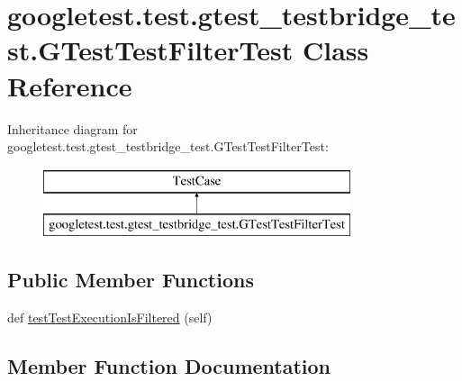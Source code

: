 \hypertarget{classgoogletest_1_1test_1_1gtest__testbridge__test_1_1_g_test_test_filter_test}{}\section{googletest.\+test.\+gtest\+\_\+testbridge\+\_\+test.\+G\+Test\+Test\+Filter\+Test Class Reference}
\label{classgoogletest_1_1test_1_1gtest__testbridge__test_1_1_g_test_test_filter_test}
Inheritance diagram for googletest.\+test.\+gtest\+\_\+testbridge\+\_\+test.\+G\+Test\+Test\+Filter\+Test\+:\begin{figure}[H]
\begin{center}
\leavevmode
\includegraphics[height=2.000000cm]{de/d91/classgoogletest_1_1test_1_1gtest__testbridge__test_1_1_g_test_test_filter_test}
\end{center}
\end{figure}
\subsection*{Public Member Functions}
\begin{DoxyCompactItemize}
\item 
def \mbox{\hyperlink{classgoogletest_1_1test_1_1gtest__testbridge__test_1_1_g_test_test_filter_test_a2b73b8b5c22aa14c8b2cf54037d40926}{test\+Test\+Execution\+Is\+Filtered}} (self)
\end{DoxyCompactItemize}


\subsection{Member Function Documentation}
\mbox{\label{classgoogletest_1_1test_1_1gtest__testbridge__test_1_1_g_test_test_filter_test_a2b73b8b5c22aa14c8b2cf54037d40926}} 
